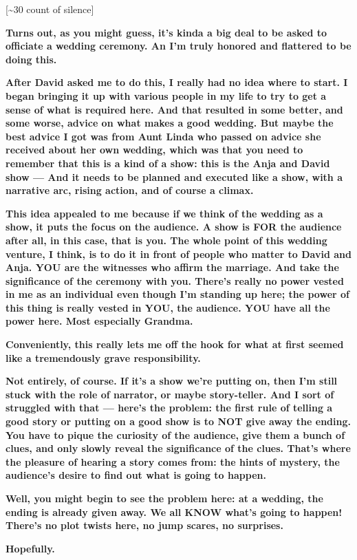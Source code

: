 {[}\textasciitilde{}30 count of silence{]}

\textbf{Turns out, as you might guess, it's kinda a big deal to be asked
to officiate a wedding ceremony. An I'm truly honored and flattered to
be doing this.}

\textbf{After David asked me to do this, I really had no idea where to
start. I began bringing it up with various people in my life to try to
get a sense of what is required here. And that resulted in some better,
and some worse, advice on what makes a good wedding. But maybe the best
advice I got was from Aunt Linda who passed on advice she received about
her own wedding, which was that you need to remember that this is a kind
of a show: this is the Anja and David show --- And it needs to be
planned and executed like a show, with a narrative arc, rising action,
and of course a climax.}

\textbf{This idea appealed to me because if we think of the wedding as a
show, it puts the focus on the audience. A show is FOR the audience
after all, in this case, that is you. The whole point of this wedding
venture, I think, is to do it in front of people who matter to David and
Anja. YOU are the witnesses who affirm the marriage. And take the
significance of the ceremony with you. There's really no power vested in
me as an individual even though I'm standing up here; the power of this
thing is really vested in YOU, the audience. YOU have all the power
here. Most especially Grandma.}

\textbf{Conveniently, this really lets me off the hook for what at first
seemed like a tremendously grave responsibility.}

\textbf{Not entirely, of course. If it's a show we're putting on, then
I'm still stuck with the role of narrator, or maybe story-teller. And I
sort of struggled with that --- here's the problem: the first rule of
telling a good story or putting on a good show is to NOT give away the
ending. You have to pique the curiosity of the audience, give them a
bunch of clues, and only slowly reveal the significance of the clues.
That's where the pleasure of hearing a story comes from: the hints of
mystery, the audience's desire to find out what is going to happen.}

\textbf{Well, you might begin to see the problem here: at a wedding, the
ending is already given away. We all KNOW what's going to happen!
There's no plot twists here, no jump scares, no surprises.}

\textbf{Hopefully.}

